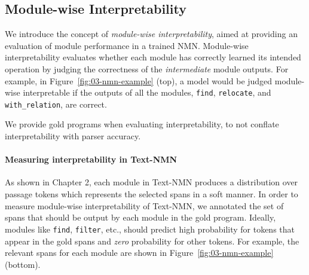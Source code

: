 \documentclass[main.tex]{subfiles}
\begin{document}
\subsection{Module-wise Interpretability}
\label{ssec:measure}

We introduce the concept of \textit{module-wise interpretability}, aimed at providing an evaluation of module performance in a trained NMN.
Module-wise interpretability evaluates whether each module has correctly learned its intended operation by judging the correctness of the \emph{intermediate} module outputs.
For example, in Figure~\ref{fig:03-nmn-example} (top), a model would be judged module-wise interpretable if the outputs of all the modules, \texttt{find}, \texttt{relocate}, and \texttt{with\_relation}, are correct.

We provide gold programs when evaluating interpretability, to not conflate  interpretability with parser accuracy.

\paragraph{Measuring interpretability in Text-NMN}
As shown in Chapter 2, each module in Text-NMN produces a distribution over passage tokens which represents the selected spans in a soft manner.
In order to measure module-wise interpretability of Text-NMN, we
annotated the set of spans that should be output by each module in the gold program.
Ideally, modules like \texttt{find}, \texttt{filter}, etc., should predict high probability for tokens that appear in the gold spans and \textit{zero} probability for other tokens. For example, the relevant spans for each module are shown in Figure~\ref{fig:03-nmn-example} (bottom).
\end{document}

